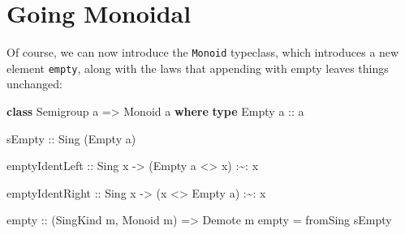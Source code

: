 \documentclass[]{article}
\newenvironment{Shaded}{}{}
\newcommand{\DataTypeTok}[1]{\textcolor[rgb]{0.56,0.13,0.00}{#1}}
\newcommand{\FunctionTok}[1]{\textcolor[rgb]{0.02,0.16,0.49}{#1}}
\newcommand{\KeywordTok}[1]{\textcolor[rgb]{0.00,0.44,0.13}{\textbf{#1}}}
\newcommand{\NormalTok}[1]{#1}
\newcommand{\OperatorTok}[1]{\textcolor[rgb]{0.40,0.40,0.40}{#1}}
\newcommand{\OtherTok}[1]{\textcolor[rgb]{0.00,0.44,0.13}{#1}}
\begin{document}
\begin{Shaded}
\end{Shaded}

\hypertarget{going-monoidal}{%
\section{Going Monoidal}\label{going-monoidal}}

Of course, we can now introduce the \texttt{Monoid} typeclass, which introduces
a new element \texttt{empty}, along with the laws that appending with empty
leaves things unchanged:

\begin{Shaded}
\begin{Highlighting}[]
\KeywordTok{class} \DataTypeTok{Semigroup}\NormalTok{ a }\OtherTok{=>} \DataTypeTok{Monoid}\NormalTok{ a }\KeywordTok{where}
    \KeywordTok{type} \DataTypeTok{Empty}\OtherTok{ a ::}\NormalTok{ a}

\OtherTok{    sEmpty ::} \DataTypeTok{Sing}\NormalTok{ (}\DataTypeTok{Empty}\NormalTok{ a)}

\NormalTok{    emptyIdentLeft}
\OtherTok{        ::} \DataTypeTok{Sing}\NormalTok{ x}
        \OtherTok{{-}>}\NormalTok{ (}\DataTypeTok{Empty}\NormalTok{ a }\OperatorTok{<>}\NormalTok{ x) }\OperatorTok{:\textasciitilde{}:}\NormalTok{ x}

\NormalTok{    emptyIdentRight}
\OtherTok{        ::} \DataTypeTok{Sing}\NormalTok{ x}
        \OtherTok{{-}>}\NormalTok{ (x }\OperatorTok{<>} \DataTypeTok{Empty}\NormalTok{ a) }\OperatorTok{:\textasciitilde{}:}\NormalTok{ x}

\NormalTok{empty}
\OtherTok{    ::}\NormalTok{ (}\DataTypeTok{SingKind}\NormalTok{ m, }\DataTypeTok{Monoid}\NormalTok{ m)}
    \OtherTok{=>} \DataTypeTok{Demote}\NormalTok{ m}
\NormalTok{empty }\OtherTok{=}\NormalTok{ fromSing sEmpty}
\end{Highlighting}
\end{Shaded}
\end{document}
